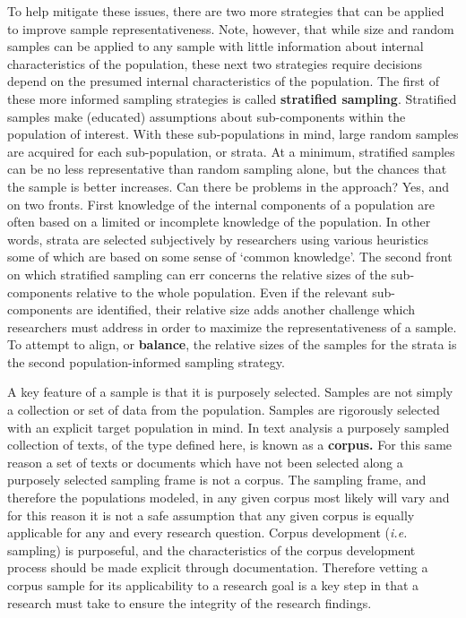 \documentclass[
  letterpaper,
]{latex/krantz}
\begin{document}
To help mitigate these issues, there are two more strategies that can be
applied to improve sample representativeness. Note, however, that while
size and random samples can be applied to any sample with little
information about internal characteristics of the population, these next
two strategies require decisions depend on the presumed internal
characteristics of the population. The first of these more informed
sampling strategies is called \textbf{stratified sampling}. Stratified
samples make (educated) assumptions about sub-components within the
population of interest. With these sub-populations in mind, large random
samples are acquired for each sub-population, or strata. At a minimum,
stratified samples can be no less representative than random sampling
alone, but the chances that the sample is better increases. Can there be
problems in the approach? Yes, and on two fronts. First knowledge of the
internal components of a population are often based on a limited or
incomplete knowledge of the population. In other words, strata are
selected subjectively by researchers using various heuristics some of
which are based on some sense of `common knowledge'. The second front on
which stratified sampling can err concerns the relative sizes of the
sub-components relative to the whole population. Even if the relevant
sub-components are identified, their relative size adds another
challenge which researchers must address in order to maximize the
representativeness of a sample. To attempt to align, or
\textbf{balance}, the relative sizes of the samples for the strata is
the second population-informed sampling strategy.

A key feature of a sample is that it is purposely selected. Samples are
not simply a collection or set of data from the population. Samples are
rigorously selected with an explicit target population in mind. In text
analysis a purposely sampled collection of texts, of the type defined
here, is known as a \textbf{corpus.} For this same reason a set of texts
or documents which have not been selected along a purposely selected
sampling frame is not a corpus. The sampling frame, and therefore the
populations modeled, in any given corpus most likely will vary and for
this reason it is not a safe assumption that any given corpus is equally
applicable for any and every research question. Corpus development
(\emph{i.e.} sampling) is purposeful, and the characteristics of the
corpus development process should be made explicit through
documentation. Therefore vetting a corpus sample for its applicability
to a research goal is a key step in that a research must take to ensure
the integrity of the research findings.
\end{document}
